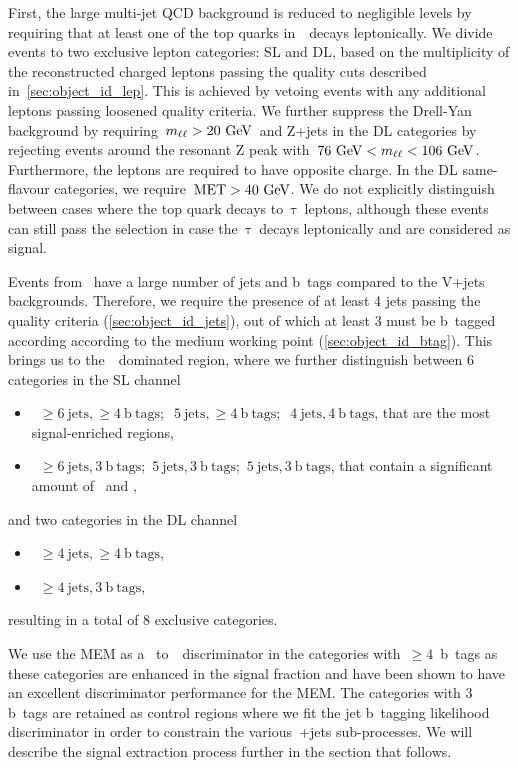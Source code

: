 First, the large multi-jet QCD background is reduced to negligible levels by requiring that at least one of the top quarks in~\ttHbb~decays leptonically. We divide events to two exclusive lepton categories: SL and DL, based on the multiplicity of the reconstructed charged leptons passing the quality cuts described in~\cref{sec:object_id_lep}. This is achieved by vetoing events with any additional leptons passing loosened quality criteria. We further suppress the Drell-Yan background by requiring~$m_{\ell\ell} > 20~\mathrm{GeV}$~and Z+jets in the DL categories by rejecting events around the resonant Z peak with~$76~\mathrm{GeV} < m_{\ell\ell} < 106~\mathrm{GeV}$. Furthermore, the leptons are required to have opposite charge. In the DL same-flavour categories, we require~$\mathrm{MET} > 40~\mathrm{GeV}$. We do not explicitly distinguish between cases where the top quark decays to~$\mathrm{\tau}$~leptons, although these events can still pass the selection in case the~$\mathrm{\tau}$~decays leptonically and are considered as signal.

Events from \ttHbb~have a large number of jets and b~tags compared to the V+jets backgrounds. Therefore, we require the presence of at least 4 jets passing the quality criteria (\cref{sec:object_id_jets}), out of which at least 3 must be b~tagged according according to the medium working point (\cref{sec:object_id_btag}). This brings us to the~\ttbar~dominated region, where we further distinguish between 6 categories in the SL channel
\begin{itemize}
\item~$\ge 6~\mathrm{jets},\ge 4~\mathrm{b~tags}$;~$~5~\mathrm{jets},\ge 4~\mathrm{b~tags}$;~$~4~\mathrm{jets},4~\mathrm{b~tags}$, that are the most signal-enriched regions,
\item~$\ge 6~\mathrm{jets},3~\mathrm{b~tags}$;~$5~\mathrm{jets}, 3~\mathrm{b~tags}$;~$5~\mathrm{jets}, 3~\mathrm{b~tags}$, that contain a significant amount of \ttcc~and \ttbb,
\end{itemize}
and two categories in the DL channel
\begin{itemize}
\item~$\ge 4~\mathrm{jets},\ge 4~\mathrm{b~tags}$,
\item~$\ge 4~\mathrm{jets},3~\mathrm{b~tags}$,
\end{itemize}
resulting in a total of 8 exclusive categories.

We use the MEM as a \ttHbb~to~\ttbb~discriminator in the categories with~$\ge 4$~b~tags as these categories are enhanced in the signal fraction and have been shown to have an excellent discriminator performance for the MEM. The categories with 3 b~tags are retained as control regions where we fit the jet b~tagging likelihood discriminator in order to constrain the various~\ttbar+jets sub-processes. We will describe the signal extraction process further in the section that follows.

